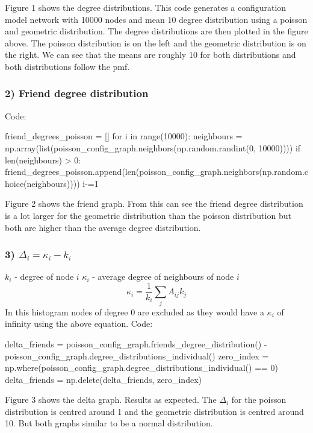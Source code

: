 \documentclass[a4paper, 11pt, oneside]{report}
\begin{document}
Figure 1 shows the degree distributions. This code generates a configuration model network with 10000 nodes and mean 10 degree distribution using a poisson and geometric distribution.
The degree distributions are then plotted in the figure above. The poisson distribution is on the left and the geometric distribution is on the right.
We can see that the means are roughly 10 for both distributions and both distributions follow the pmf.

\subsubsection*{2) Friend degree distribution}

Code:
\begin{verbnobox}[\fontsize{8pt}{8pt}\selectfont]
    friend_degrees_poisson = []
    for i in range(10000):
        neighbours = np.array(list(poisson_config_graph.neighbors(np.random.randint(0, 10000))))
        if len(neighbours) > 0:
            friend_degrees_poisson.append(len(poisson_config_graph.neighbors(np.random.choice(neighbours))))
            i-=1
\end{verbnobox}

Figure 2 shows the friend graph. From this can see the friend degree distribution is a lot larger for the geometric distribution than the poisson distribution but both are higher than the average degree distribution.

\subsubsection*{3) $\Delta_i = \kappa_i - k_i$}
$k_i$ - degree of node $i$
$\kappa_i$ - average degree of neighbours of node $i$
$$\kappa_i = \frac{1}{k_i} \sum_j A_{ij}k_j$$
In this histogram nodes of degree 0 are excluded as they would have a $\kappa_i$ of infinity using the above equation.
Code:
\begin{verbnobox}[\fontsize{8pt}{8pt}\selectfont]
    delta_friends = poisson_config_graph.friends_degree_distribution() - poisson_config_graph.degree_distributions_individual()
    zero_index = np.where(poisson_config_graph.degree_distributions_individual() == 0)
    delta_friends = np.delete(delta_friends, zero_index)
\end{verbnobox}

Figure 3 shows the delta graph. Results as expected. The $\Delta_i$ for the poisson distribution is centred around 1 and the geometric distribution is centred around 10. But both graphs similar to be a normal distribution.
\end{document}
